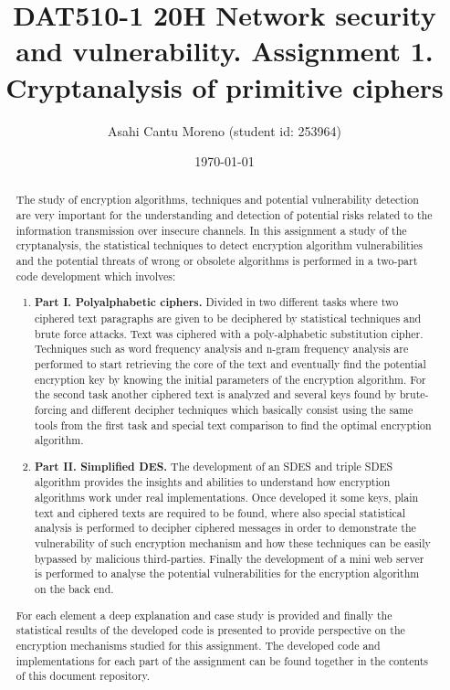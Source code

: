 \documentclass[letterpaper,12pt]{article}
\begin{document}
\title{DAT510-1 20H Network security and vulnerability. Assignment 1. Cryptanalysis of primitive ciphers}
\author{Asahi Cantu Moreno (student id: 253964)}
\date{\today}
\maketitle

\begin{abstract}
The study of encryption algorithms, techniques and potential vulnerability detection are very important for the understanding and detection of potential risks related to the information transmission over insecure channels. In this assignment a study of the cryptanalysis, the statistical techniques to detect encryption algorithm vulnerabilities and the potential threats of wrong or obsolete algorithms is performed in a two-part code development which involves:
\begin{enumerate}
    \item \textbf{Part I. Polyalphabetic ciphers.} Divided in two different tasks where two ciphered text paragraphs are given to be deciphered by statistical techniques and brute force attacks. Text was ciphered with a poly-alphabetic substitution cipher. Techniques such as word frequency analysis and n-gram frequency analysis are performed to start retrieving the core of the text and eventually find the potential encryption key by knowing the initial parameters of the encryption algorithm. For the second task another ciphered text is analyzed and several keys found by brute-forcing and different decipher techniques which basically consist using the same tools from the first task and special text comparison to find the optimal encryption algorithm.
    \item \textbf{Part II. Simplified DES.} The development of an SDES and triple SDES algorithm provides the insights and abilities to understand how encryption algorithms work under real implementations. Once developed it some keys, plain text and ciphered texts are required to be found, where also special statistical analysis is performed to decipher ciphered messages in order to demonstrate the vulnerability of such encryption mechanism and how these techniques can be easily bypassed by malicious third-parties. Finally the development of a mini web server is performed to analyse the potential vulnerabilities for the encryption algorithm on the back end.
\end{enumerate}
For each element a deep explanation and case study is provided and finally the statistical results of the developed code is presented to provide perspective on the encryption mechanisms studied for this assignment.
The developed code and implementations for each part of the assignment can be found together in the contents of this document repository.
\end{abstract}
\newpage
\end{document}
